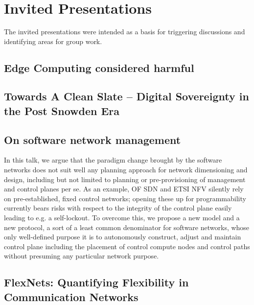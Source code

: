 \section{Invited Presentations}\label{sec:invited-presentations}

The invited presentations were intended as a basis for triggering discussions
and identifying areas for group work.

\subsection{Edge Computing considered harmful}


\subsection{Towards A Clean Slate -- Digital Sovereignty in the Post Snowden Era}


\subsection{On software network management}

In this talk, we argue that the paradigm change brought by the software
networks does not suit well any planning approach for network dimensioning and
design, including but not limited to planning or pre-provisioning of
management and control planes per se. As an example, OF SDN and ETSI NFV
silently rely on pre-established, fixed control networks; opening these up for
programmability currently bears risks with respect to the integrity of the
control plane easily leading to e.g. a self-lockout. To overcome this, we
propose a new model and a new protocol, a sort of a least common denominator
for software networks, whose only well-defined purpose it is to autonomously
construct, adjust and maintain control plane including the placement of
control compute nodes and control paths without presuming any particular
network purpose.

\subsection{FlexNets: Quantifying Flexibility in Communication Networks}


